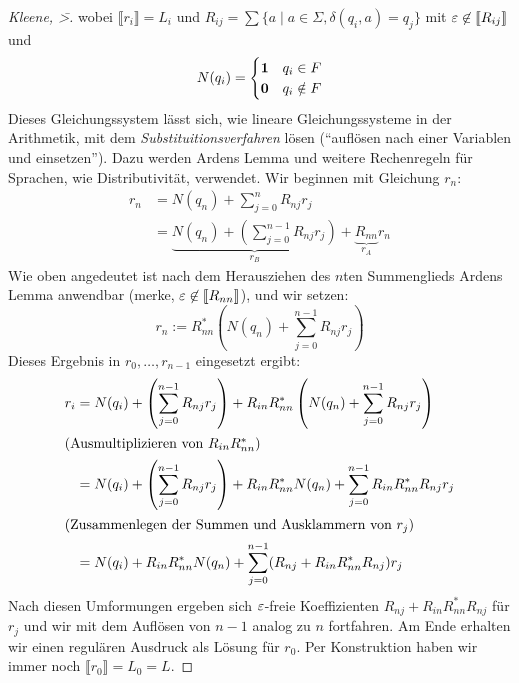 {\begin{proof}[Kleene, \=>]
    wobei $\llbracket r_i \rrbracket = L_i$ und $R_{ij } = \sum \{a \mid a \in \Sigma, \delta(q_i, a) = q_j\}$ mit $\varepsilon \not \in \llbracket R_{ij} \rrbracket$ und
    \begin{displaymath}
      N(q_i) =
      \begin{cases}
        \mathbf{1} & q_i\in F\\
        \mathbf{0} & q_i\notin F
      \end{cases}
    \end{displaymath}
    Dieses Gleichungssystem lässt sich, wie lineare Gleichungssysteme in der Arithmetik, mit dem \emph{Substituitionsverfahren} lösen ("`auflösen nach einer Variablen und einsetzen"').
    Dazu werden Ardens Lemma und weitere Rechenregeln für Sprachen, wie Distributivität, verwendet.
    Wir beginnen mit Gleichung $r_n$:
    \begin{align*}
      r_n &= N(q_n) + \sum_{j = 0}^n R_{nj} r_j \\
          &= \underbrace{N(q_n) + \left (\sum_{j = 0}^{n-1} R_{nj} r_j \right)}_{r_B} + \underbrace{R_{nn}}_{r_A} r_n
    \end{align*}
    Wie oben angedeutet ist nach dem Herausziehen des $n$ten Summenglieds Ardens Lemma anwendbar (merke, $\varepsilon \not \in \llbracket R_{nn} \rrbracket$), und wir setzen:
    \begin{displaymath}
      r_n := R_{nn}^*\left(N(q_n) + \sum_{j = 0}^{n-1} R_{nj} r_j  \right)
    \end{displaymath}
    Dieses Ergebnis in $r_0,\ldots,r_{n-1}$ eingesetzt ergibt:
    \begin{align*}
      r_i &= N(q_i) + \left (\sum_{j = 0}^{n-1} R_{nj} r_j \right) + R_{in}R_{nn}^*\left(N(q_n) + \sum_{j = 0}^{n-1} R_{nj} r_j  \right) \\
      \intertext{(Ausmultiplizieren von $R_{in}R_{nn}^*$)}
          &= N(q_i) + \left (\sum_{j = 0}^{n-1} R_{nj} r_j \right) + R_{in}R_{nn}^*N(q_n) + \sum_{j = 0}^{n-1} R_{in}R_{nn}^*R_{nj} r_j  \\
      \intertext{(Zusammenlegen der Summen und Ausklammern von $r_j$)}
          &= N(q_i) + R_{in}R_{nn}^*N(q_n) + \sum_{j = 0}^{n-1} (R_{nj} + R_{in}R_{nn}^*R_{nj}) r_j  \\
    \end{align*}
  Nach diesen Umformungen ergeben sich $\varepsilon$-freie Koeffizienten $R_{nj} + R_{in}R_{nn}^*R_{nj}$ für $r_j$ und wir mit dem Auflösen von $n-1$ analog zu $n$ fortfahren.
  Am Ende erhalten wir einen regulären Ausdruck als Lösung für $r_0$.
  Per Konstruktion haben wir immer noch $\llbracket r_0 \rrbracket = L_0 = L$.
  \end{proof}
    

}
